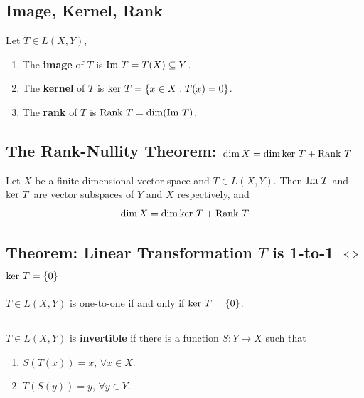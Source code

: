 \documentclass[11pt]{elegantbook}
\begin{document}
\subsection{Image, Kernel, Rank}
\begin{definition}
    \normalfont
    Let $T\in L(X,Y)$,
    \begin{enumerate}[$\circ$]
        \item The \textbf{image} of $T$ is $\textnormal{Im }T= T(X)\subseteq Y$.
        \item The \textbf{kernel} of $T$ is $\textnormal{ker }T=\{x\in X:T(x)=0\}$.
        \item The \textbf{rank} of $T$ is $\textnormal{Rank }T=\dim(\textnormal{Im }T)$.
    \end{enumerate}
\end{definition}


\subsection{The Rank-Nullity Theorem: $\dim X=\dim\textnormal{ker }T+\textnormal{Rank }T$}
\begin{theorem}
    Let $X$ be a finite-dimensional vector space and $T \in L(X, Y)$. Then $\textnormal{Im }T$ and $\textnormal{ker }T$ are vector subspaces of $Y$ and $X$ respectively, and
    $$\dim X=\dim\textnormal{ker }T+\textnormal{Rank }T$$
\end{theorem}


\subsection{Theorem: Linear Transformation $T$ is 1-to-1 $\Leftrightarrow$ $\textnormal{ker }T = \{0\}$}
\begin{theorem}[1-to-1 $\Leftrightarrow$ $\textnormal{ker }T = \{0\}$]
    $T \in L(X, Y)$ is one-to-one if and only if $\textnormal{ker }T = \{0\}$.
\end{theorem}


\subsection{}
\begin{definition}
    \normalfont
    $T \in L(X, Y )$ is \textbf{invertible} if there is a function $S : Y \rightarrow X$ such that
    \begin{enumerate}
        \item $S(T(x))=x$, $\forall x\in X$.
        \item $T(S(y))=y$, $\forall y\in Y$.
    \end{enumerate}
\end{definition}
\end{document}
